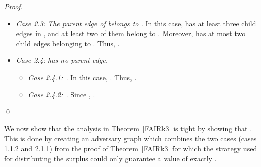 \documentclass[smallextended]{svjour3}
\begin{document}
\begin{proof}
\begin{itemize}
\item {\em Case 2.3: The parent edge of  belongs to .} In this case,  has at least three child edges in , and at least two of them belong to . Moreover,  has at most two child edges belonging to . Thus, .
\item {\em Case 2.4:  has no parent edge.}
  \begin{itemize}
  \item {\em Case 2.4.1: .}
    In this case, .
    Thus, .
  \item {\em Case 2.4.2: .} 
Since , .
  \end{itemize}
\end{itemize}
\qed\end{proof}

We now show that the analysis in Theorem~\ref{FAIRk3} is tight by showing that . This is done by creating an adversary graph which combines the two cases (cases 1.1.2 and 2.1.1) from the proof of Theorem~\ref{FAIRk3} for which the strategy used for distributing the surplus could only guarantee a value of exactly .
\end{document}
